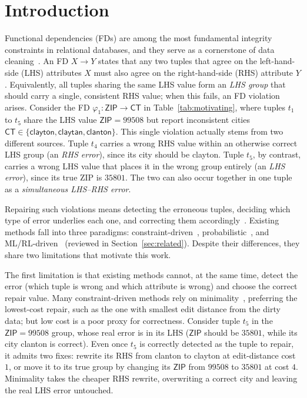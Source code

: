 \documentclass[sigconf]{acmart}
\begin{document}
\section{Introduction}
\label{sec:intro}
Functional dependencies (FDs) are among the most fundamental integrity constraints in relational databases, and they serve as a cornerstone of data cleaning~\cite{b1,b2}. An FD $X \rightarrow Y$ states that any two tuples that agree on the left-hand-side (LHS) attributes $X$ must also agree on the right-hand-side (RHS) attribute $Y$. Equivalently, all tuples sharing the same LHS value form an \emph{LHS group} that should carry a single, consistent RHS value; when this fails, an FD violation arises. Consider the FD $\varphi_1: \textsf{ZIP} \rightarrow \textsf{CT}$ in Table~\ref{tab:motivating}, where tuples $t_1$ to $t_5$ share the LHS value $\textsf{ZIP}=99508$ but report inconsistent cities $\textsf{CT} \in \{\textsf{clayton}, \textsf{claytan}, \textsf{clanton}\}$. This single violation actually stems from two different sources. Tuple $t_4$ carries a wrong RHS value within an otherwise correct LHS group (an \emph{RHS error}), since its city should be \textsf{clayton}. Tuple $t_5$, by contrast, carries a wrong LHS value that places it in the wrong group entirely (an \emph{LHS error}), since its true ZIP is $35801$. The two can also occur together in one tuple as a \emph{simultaneous LHS--RHS error}.

Repairing such violations means detecting the erroneous tuples, deciding which type of error underlies each one, and correcting them accordingly~\cite{b6,b8}. Existing methods fall into three paradigms: constraint-driven~\cite{b2,b33}, probabilistic~\cite{b1,b9}, and ML/RL-driven~\cite{b23,b38} (reviewed in Section~\ref{sec:related}). Despite their differences, they share two limitations that motivate this work.

The first limitation is that existing methods cannot, at the same time, detect the error (which tuple is wrong and which attribute is wrong) and choose the correct repair value. Many constraint-driven methods rely on minimality~\cite{b2,b33,b7}, preferring the lowest-cost repair, such as the one with smallest edit distance from the dirty data; but low cost is a poor proxy for correctness. Consider tuple $t_5$ in the $\textsf{ZIP}=99508$ group, whose real error is in its LHS ($\textsf{ZIP}$ should be $35801$, while its city \textsf{clanton} is correct). Even once $t_5$ is correctly detected as the tuple to repair, it admits two fixes: rewrite its RHS from \textsf{clanton} to \textsf{clayton} at edit-distance cost $1$, or move it to its true group by changing its $\textsf{ZIP}$ from $99508$ to $35801$ at cost $4$. Minimality takes the cheaper RHS rewrite, overwriting a correct city and leaving the real LHS error untouched.
\end{document}

